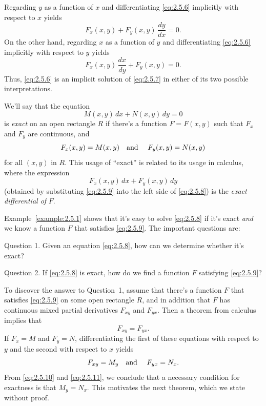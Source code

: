 \proof Regarding $y$ as a function of $x$ and differentiating \eqref{eq:2.5.6} implicitly with
respect to $x$ yields
\[
  F_{x}(x,y)+F_{y}(x,y)\,\frac{dy}{dx}=0.
\]
On the other hand, regarding $x$ as a function of $y$ and differentiating \eqref{eq:2.5.6}
implicitly with respect to $y$ yields
\[
  F_{x}(x,y)\,\frac{dx}{dy}+F_{y}(x,y)=0.
\]
Thus, \eqref{eq:2.5.6} is an implicit solution of \eqref{eq:2.5.7} in either of its two possible
interpretations. \bbox

We'll say that the equation
\begin{equation}
  \label{eq:2.5.8}M(x,y)\,dx+N(x,y)\,dy=0
\end{equation}
is {\color{blue}\it exact} on an open rectangle $R$ if there's a function $F=F(x,y)$ such that $F_{x}$
and $F_{y}$ are continuous, and
\begin{equation}
  \label{eq:2.5.9}F_{x}(x,y)=M(x,y)\mbox{\quad and \quad}F_{y}(x,y)=N(x,y)
\end{equation}
for all $(x,y)$ in $R$. This usage of ``exact'' is related to its usage in calculus, where the
expression
\[
  F_{x}(x,y)\,dx+F_{y}(x,y)\,dy
\]
(obtained by substituting \eqref{eq:2.5.9} into the left side of \eqref{eq:2.5.8}) is the
{\color{blue}\it exact differential of\/} $F$.

Example~\ref{example:2.5.1} shows that it's easy to solve \eqref{eq:2.5.8} if it's exact
{\color{blue}\it and} we know a function $F$ that satisfies \eqref{eq:2.5.9}. The important
questions are:

{\sc Question 1.} Given an equation \eqref{eq:2.5.8}, how can we determine whether it's exact?

{\sc Question 2.} If \eqref{eq:2.5.8} is exact, how do we find a function $F$ satisfying
\eqref{eq:2.5.9}?

To discover the answer to Question~1, assume that there's a function $F$ that satisfies
\eqref{eq:2.5.9} on some open rectangle $R$, and in addition that $F$ has continuous mixed partial
derivatives $F_{xy}$ and $F_{yx}$. Then a theorem from calculus implies that
\begin{equation}
  \label{eq:2.5.10}F_{xy}=F_{yx}.
\end{equation}
If $F_{x}=M$ and $F_{y}=N$, differentiating the first of these equations with respect to $y$ and the
second with respect to $x$ yields
\begin{equation}
  \label{eq:2.5.11}F_{xy}=M_{y}\mbox{\quad and \quad}F_{yx}=N_{x}.
\end{equation}
From \eqref{eq:2.5.10} and \eqref{eq:2.5.11}, we conclude that a necessary condition for exactness
is that $M_{y}=N_{x}$. This motivates the next theorem, which we state without proof.


